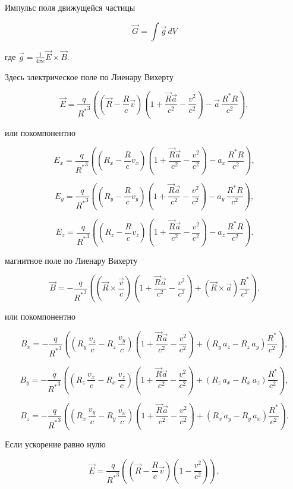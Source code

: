 \documentclass[11pt]{article}
\begin{document}
    Импульс поля движущейся частицы

\[\vec G = \int \vec g \, dV\]

где \(\vec g = \frac{1}{4 \pi c} \vec E \times \vec B\).

Здесь электрическое поле по Лиенару Вихерту

\[\vec{E} = \frac{q}{{{R}^{*}}^{3}}\left( \left(\vec{R}-\frac{R}{c}\vec{v} \right) \left(1 + \frac{\vec{R}\vec{a}}{c^2} - \frac{v^2}{c^2} \right) - \vec{a}\,\frac{{R}^{*}R}{c^2} \right),\]

    или покомпонентно

    \[{E_x} = \frac{q}{{{R}^{*}}^{3}}\left( \left({R_x}-\frac{R}{c}{v_x} \right) \left(1 + \frac{\vec{R}\vec{a}}{c^2} - \frac{v^2}{c^2} \right) - {a_x}\,\frac{{R}^{*}R}{c^2} \right),\]

    \[{E_y} = \frac{q}{{{R}^{*}}^{3}}\left( \left({R_y}-\frac{R}{c}{v_y} \right) \left(1 + \frac{\vec{R}\vec{a}}{c^2} - \frac{v^2}{c^2} \right) - {a_y}\,\frac{{R}^{*}R}{c^2} \right),\]

    \[{E_z} = \frac{q}{{{R}^{*}}^{3}}\left( \left({R_z}-\frac{R}{c}{v_z} \right) \left(1 + \frac{\vec{R}\vec{a}}{c^2} - \frac{v^2}{c^2} \right) - {a_z}\,\frac{{R}^{*}R}{c^2} \right).\]

    магнитное поле по Лиенару Вихерту

    \[\vec{B} = -\frac{q}{{{R}^{*}}^3}\left(\left(\vec{R}\times\frac{\vec{v}}{c}\right)\left(1 + \frac{\vec{R}\vec{a}}{c^2} - \frac{v^2}{c^2}\right) + \left(\vec{R}\times\vec{a}\right)\frac{{{R}^{*}}}{c^2}\right).\]

    или покомпонентно

    \[{B_x} = -\frac{q}{{{R}^{*}}^3}\left(\left(R_y\,\frac{v_z}{c} -  R_z\,\frac{v_y}{c}\right)\left(1 + \frac{\vec{R}\vec{a}}{c^2} - \frac{v^2}{c^2}\right) + \left(R_y\,a_z -  R_z\,a_y\right)\frac{{{R}^{*}}}{c^2}\right),\]

    \[{B_y} = -\frac{q}{{{R}^{*}}^3}\left(\left(R_z\,\frac{v_x}{c} -  R_x\,\frac{v_z}{c}\right)\left(1 + \frac{\vec{R}\vec{a}}{c^2} - \frac{v^2}{c^2}\right) + \left(R_z\,a_x -  R_x\,a_z\right)\frac{{{R}^{*}}}{c^2}\right),\]

    \[{B_z} = -\frac{q}{{{R}^{*}}^3}\left(\left(R_x\,\frac{v_y}{c} -  R_y\,\frac{v_x}{c}\right)\left(1 + \frac{\vec{R}\vec{a}}{c^2} - \frac{v^2}{c^2}\right) + \left(R_x\,a_y -  R_y\,a_x\right)\frac{{{R}^{*}}}{c^2}\right).\]

    Если ускорение равно нулю

    \[\vec{E} = \frac{q}{{{R}^{*}}^{3}}\left( \left(\vec{R}-\frac{R}{c}\vec{v} \right) \left(1 - \frac{v^2}{c^2} \right) \right),\]
\end{document}
